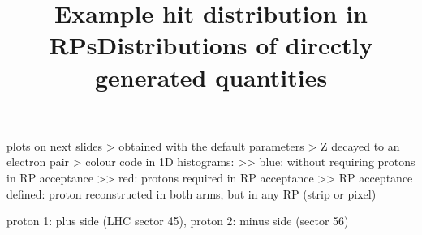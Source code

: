 \> plots on next slides
\>> obtained with the default parameters
\>> Z decayed to an electron pair
\>> colour code in 1D histograms:
\>>> blue: without requiring protons in RP acceptance
\>>> red: protons required in RP acceptance
\>>> RP acceptance defined: proton reconstructed in both arms, but in any RP (strip or pixel)


\newpage %
\title{Example hit distribution in RPs}

\centerline{}


\newpage %
\title{Distributions of directly generated quantities}

\centerline{}

\newpage %

\> proton 1: plus side (LHC sector 45), proton 2: minus side (sector 56)

\centerline{}


\newpage %

\centerline{}


\newpage %

\centerline{}


\newpage %

\centerline{}


\newpage %

\centerline{}


\newpage %

\centerline{}

\vfil
\eject
\bye
